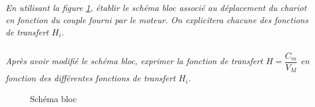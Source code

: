 \documentclass[10pt,fleqn]{article} %
\begin{document}
\begin{multicols}{2}
\begin{corrige}
\begin{center}
\end{center}
\end{corrige}
\else
\fi
\subparagraph{} \textit{En utilisant la figure \ref{fig1}, établir le schéma bloc associé au déplacement du chariot en fonction du couple fourni par le moteur. On explicitera chacune des fonctions de transfert $H_i$.}

\subparagraph{} \textit{Après avoir modifié le schéma bloc, exprimer la fonction de transfert $H=\dfrac{C_m}{V_M}$ en fonction des différentes fonctions de transfert $H_i$.}




\ifprof
\else
\end{multicols}
\fi

\ifprof

\begin{figure}[h]
\begin{center}
\end{center}
\caption{Schéma bloc \label{fig1}}
\end{figure}
\end{document}
